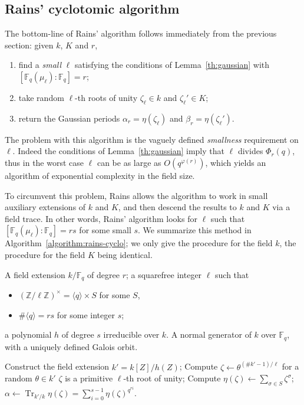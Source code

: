 \documentclass[12pt]{article}
\theoremstyle{plain}
\theoremstyle{definition}
\DeclareMathOperator{\trace}{Tr} %
\def\Z{\ensuremath{\mathbb{Z}}}
\def\F{\ensuremath{\mathbb{F}}}
\def\euler{\ensuremath{\varphi}}
\newcounter{algorithm}
\begin{document}
\subsection{Rains' cyclotomic algorithm}

The bottom-line of Rains' algorithm follows immediately from the
previous section: given $k$, $K$ and $r$,
\begin{enumerate}
\item find a \emph{small} $\ell$ satisfying the conditions of
  Lemma~\ref{th:gaussian} with $[\F_q(\mu_\ell):\F_q]=r$;
\item take random $\ell$-th roots of unity $\zeta_\ell\in k$ and
  $\zeta_\ell'\in K$;
\item return the Gaussian periods $\alpha_r=\eta(\zeta_\ell)$ and
  $\beta_r=\eta(\zeta_\ell')$.
\end{enumerate}

The problem with this algorithm is the vaguely defined
\emph{smallness} requirement on $\ell$. Indeed the conditions of
Lemma~\ref{th:gaussian} imply that $\ell$ divides $\Phi_r(q)$, thus in
the worst case $\ell$ can be as large as $O(q^{\euler(r)})$, which
yields an algorithm of exponential complexity in the field size.

To circumvent this problem, Rains allows the algorithm to work in
small auxiliary extensions of $k$ and $K$, and then descend the
results to $k$ and $K$ via a field trace. In other words, Rains'
algorithm looks for $\ell$ such that $[\F_q(\mu_\ell):\F_q]=rs$ for
some small $s$. We summarize this method in
Algorithm~\ref{algorithm:rains-cyclo}; we only give the procedure for
the field $k$, the procedure for the field $K$ being identical.

\begin{algorithm}
  \label{algorithm:rains-cyclo}
  \begin{algorithmic}[1]
    \REQUIRE A field extension $k/\F_q$ of degree $r$; a squarefree
    integer $\ell$ such that
    \begin{itemize}
    \item $(\Z/\ell\Z)^\times = \langle q\rangle \times S$ for some $S$,
    \item $\#\langle q\rangle = rs$ for some integer $s$;
    \end{itemize}
    a polynomial $h$ of degree $s$ irreducible over $k$.
    \ENSURE A normal generator of $k$ over $\F_q$,
    with a uniquely defined Galois orbit.
    
    \STATE Construct the field extension $k'=k[Z]/h(Z)$;
    \REPEAT
    \STATE\label{algorithm:rains-cyclo:power} Compute $\zeta\leftarrow \theta^{(\#k'-1)/\ell}$ for a random $\theta\in k'$
    \UNTIL $\zeta$ is a primitive $\ell$-th root of unity;
    \STATE\label{algorithm:rains-cyclo:period} Compute $\eta(\zeta) \leftarrow \sum_{\sigma\in S}\zeta^\sigma$;
    \RETURN\label{algorithm:rains-cyclo:trace} $\alpha \leftarrow \trace_{k'/k}\eta(\zeta) = \sum_{i=0}^{s-1}\eta(\zeta)^{q^{ri}}$.
  \end{algorithmic}
\end{algorithm}
\end{document}

